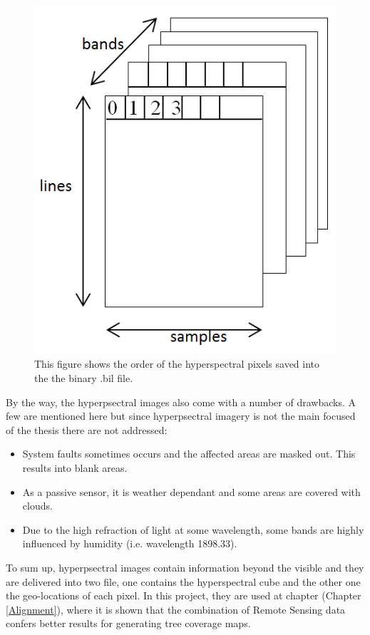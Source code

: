 \documentclass{subfiles}
\begin{document}
	\begin{figure}[!htbp]
		\centering
		\includegraphics[width=\textwidth/5*2]{img/HI_bilFile}
		\caption[Hyperpsectral Cube]{This figure shows the order of the hyperspectral pixels saved into the the binary .bil file.}
		\label{fig:hyperspectralCube}
	\end{figure}
	
	By the way, the hyperpsectral images also come with a number of drawbacks. A few are mentioned here but since hyperpsectral imagery is not the main focused of the thesis there are not addressed:
	\begin{itemize}
		\item System faults sometimes occurs and the affected areas are masked out. This results into blank areas. 
		\item As a passive sensor, it is weather dependant and some areas are covered with clouds.
		\item Due to the high refraction of light at some wavelength, some bands are highly influenced by humidity (i.e. wavelength 1898.33).
	\end{itemize}
	
	To sum up, hyperpsectral images contain information beyond the visible and they are delivered into two file, one contains the hyperspectral cube and the other one the geo-locations of each pixel. In this project, they are used at chapter (Chapter \ref{Alignment}), where it is shown that the combination of Remote Sensing data confers better results for generating tree coverage maps. 
	
	
	
	
\end{document}
